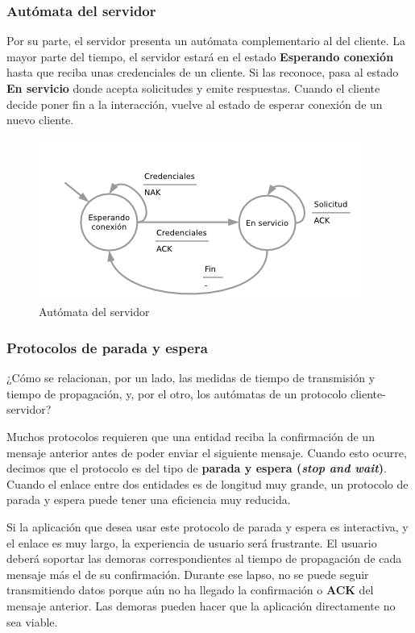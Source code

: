 \documentclass[spanish,a4paper,]{article}
\begin{document}
\hypertarget{autuxf3mata-del-servidor}{%
\subsubsection{Autómata del servidor}\label{autuxf3mata-del-servidor}}

Por su parte, el servidor presenta un autómata complementario al del
cliente. La mayor parte del tiempo, el servidor estará en el estado
\textbf{Esperando conexión} hasta que reciba unas credenciales de un
cliente. Si las reconoce, pasa al estado \textbf{En servicio} donde
acepta solicitudes y emite respuestas. Cuando el cliente decide poner
fin a la interacción, vuelve al estado de esperar conexión de un nuevo
cliente.

\begin{figure}
\centering
\includegraphics{img/protocolo-servidor.png}
\caption{Autómata del servidor}
\end{figure}

\hypertarget{protocolos-de-parada-y-espera}{%
\subsubsection{Protocolos de parada y
espera}\label{protocolos-de-parada-y-espera}}

¿Cómo se relacionan, por un lado, las medidas de tiempo de transmisión y
tiempo de propagación, y, por el otro, los autómatas de un protocolo
cliente-servidor?

Muchos protocolos requieren que una entidad reciba la confirmación de un
mensaje anterior antes de poder enviar el siguiente mensaje. Cuando esto
ocurre, decimos que el protocolo es del tipo de \textbf{parada y espera
(\emph{stop and wait})}. Cuando el enlace entre dos entidades es de
longitud muy grande, un protocolo de parada y espera puede tener una
eficiencia muy reducida.

Si la aplicación que desea usar este protocolo de parada y espera es
interactiva, y el enlace es muy largo, la experiencia de usuario será
frustrante. El usuario deberá soportar las demoras correspondientes al
tiempo de propagación de cada mensaje más el de su confirmación. Durante
ese lapso, no se puede seguir transmitiendo datos porque aún no ha
llegado la confirmación o \textbf{ACK} del mensaje anterior. Las demoras
pueden hacer que la aplicación directamente no sea viable.
\end{document}

